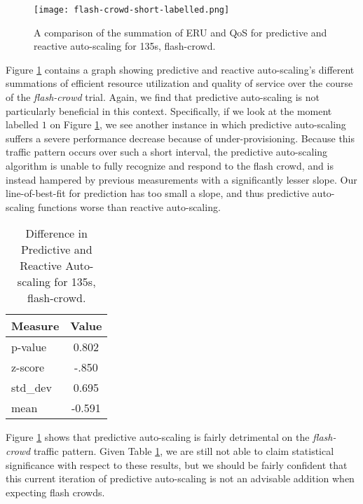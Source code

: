 \begin{figure}[!h]
  \centerline{\texttt{[image: flash-crowd-short-labelled.png]}}
  \caption{A comparison of the summation of ERU and QoS for
    predictive and reactive auto-scaling for 135s, flash-crowd.}
  \label{fig:135s-flash-crowd-labelled}
\end{figure}

Figure \ref{fig:135s-flash-crowd-labelled} contains a graph
showing predictive and reactive auto-scaling's different
summations of efficient resource utilization and quality of service over the
course of the \textit{flash-crowd} trial. Again,
we find that predictive auto-scaling is not particularly
beneficial in this context. Specifically, if we look at the moment labelled
$1$ on Figure \ref{fig:135s-flash-crowd-labelled}, we see another instance in which
predictive auto-scaling suffers a severe performance decrease because of
under-provisioning. Because this traffic pattern occurs over such a short
interval, the predictive auto-scaling algorithm is unable to fully recognize and
respond to the flash crowd, and is instead hampered by previous measurements
with a significantly lesser slope. Our line-of-best-fit for prediction has too
small a slope, and thus predictive auto-scaling functions worse than reactive
auto-scaling.

\begin{table}[htbp]
  \centering
  \caption{Difference in Predictive and Reactive Auto-scaling for 135s,
  flash-crowd.}
  \label{tab:135s-flash-crowd}
\begin{tabular}{l c}\hline\hline
    \multicolumn{1}{c}{\textbf{Measure}} & \textbf{Value} \\ \hline
     p-value & 0.802 \\
     z-score & -.850 \\
     std\_dev & 0.695 \\
     mean & -0.591
  \end{tabular}
\end{table}

Figure \ref{fig:135s-flash-crowd-labelled} shows that predictive
auto-scaling is fairly detrimental on the \textit{flash-crowd} traffic pattern.
Given Table \ref{tab:135s-flash-crowd}, we are still not able to claim
statistical significance with respect to these results, but we should be fairly
confident that this current iteration of predictive auto-scaling is not an advisable addition
when expecting flash crowds.
